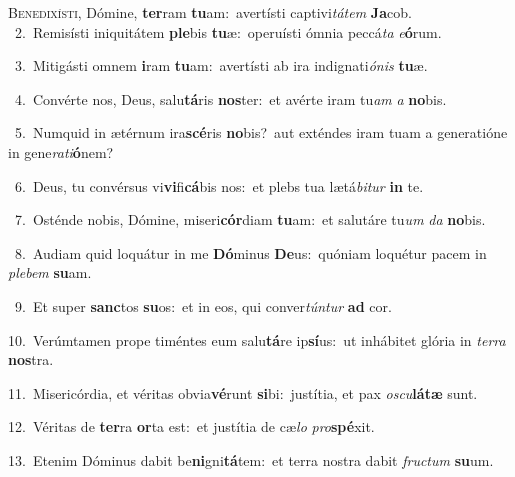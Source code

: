 \lettrine{\initial\textcolor{\initialcolor}{B}}{enedixísti,} Dómine, \textbf{ter}\-ram \textbf{tu}\-am:~\star avertísti captivi\-\textit{tá}\-\textit{tem} \textbf{Ja}\-cob.\\
{\numbfont\textcolor{\numbcolor}{~2.}}~Remisísti iniquitátem \textbf{ple}\-bis \textbf{tu}\-æ:~\star operuísti ómnia peccá\textit{ta} \textit{e}\-\textbf{ó}rum.\par
{\numbfont\textcolor{\numbcolor}{~3.}}~Mitigásti omnem \textbf{i}\-ram \textbf{tu}\-am:~\star avertísti ab ira indignati\-\textit{ó}\-\textit{nis} \textbf{tu}\-æ.\par
{\numbfont\textcolor{\numbcolor}{~4.}}~Convérte nos, Deus, salu\-\textbf{tá}\-ris \textbf{nos}\-ter:~\star et avérte iram tu\textit{am} \textit{a} \textbf{no}\-bis.\par
{\numbfont\textcolor{\numbcolor}{~5.}}~Numquid in ætérnum ira\-\textbf{scé}\-ris \textbf{no}\-bis?~\star aut exténdes iram tuam a generatióne in gene\-\textit{ra}\-\textit{ti}\textbf{ó}nem?\par
{\numbfont\textcolor{\numbcolor}{~6.}}~Deus, tu convérsus vi\-\textbf{vi}\-fi\-\textbf{cá}\-bis nos:~\star et plebs tua lætá\-\textit{bi}\-\textit{tur} \textbf{in} te.\par
{\numbfont\textcolor{\numbcolor}{~7.}}~Osténde nobis, Dómine, miseri\-\textbf{cór}\-diam \textbf{tu}\-am:~\star et salutáre tu\textit{um} \textit{da} \textbf{no}\-bis.\par
{\numbfont\textcolor{\numbcolor}{~8.}}~Audiam quid loquátur in me \textbf{Dó}\-minus \textbf{De}\-us:~\star quóniam loquétur pacem in \textit{ple}\-\textit{bem} \textbf{su}\-am.\par
{\numbfont\textcolor{\numbcolor}{~9.}}~Et super \textbf{sanc}\-tos \textbf{su}\-os:~\star et in eos, qui conver\-\textit{tún}\-\textit{tur} \textbf{ad} cor.\par
{\numbfont\textcolor{\numbcolor}{10.}}~Verúmtamen prope timéntes eum salu\-\textbf{tá}\-re ip\-\textbf{sí}\-us:~\star ut inhábitet glória in \textit{ter}\-\textit{ra} \textbf{nos}\-tra.\par
{\numbfont\textcolor{\numbcolor}{11.}}~Misericórdia, et véritas obvia\-\textbf{vé}\-runt \textbf{si}\-bi:~\star justítia, et pax \textit{os}\-\textit{cu}\textbf{lá}\textbf{tæ} sunt.\par
{\numbfont\textcolor{\numbcolor}{12.}}~Véritas de \textbf{ter}\-ra \textbf{or}\-ta est:~\star et justítia de cæ\textit{lo} \textit{pro}\-\textbf{spé}xit.\par
{\numbfont\textcolor{\numbcolor}{13.}}~Etenim Dóminus dabit be\-\textbf{ni}\-gni\-\textbf{tá}\-tem:~\star et terra nostra dabit \textit{fruc}\-\textit{tum} \textbf{su}\-um.\par
